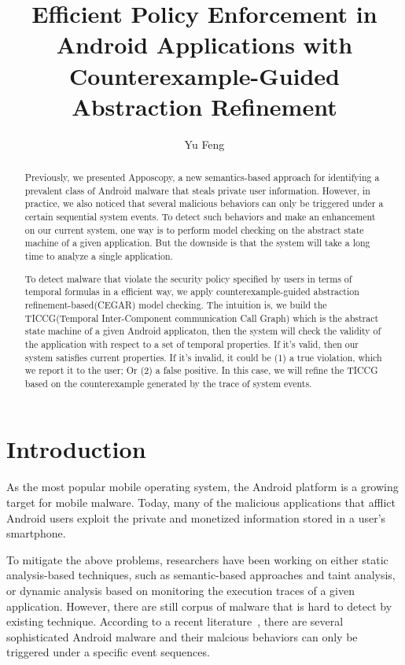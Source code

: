 \documentclass{article}
\begin{document}
\title{Efficient Policy Enforcement in Android Applications with Counterexample-Guided Abstraction Refinement}
\author{Yu Feng}

\maketitle

\begin{abstract}
Previously, we presented Apposcopy, a new semantics-based approach 
for identifying a prevalent class of Android malware that steals 
private user information. However, in practice, we also noticed 
that several malicious behaviors can only be triggered under a 
certain sequential system events. To detect such behaviors and make
an enhancement on our current system, one way is to perform model
checking on the abstract state machine of a given application.
But the downside is that the system will take a long time to analyze
a single application. 

To detect malware that violate the security policy specified by users 
in terms of temporal formulas in a efficient way, we apply 
counterexample-guided abstraction refinement-based(CEGAR) model 
checking. The intuition is, we build the TICCG(Temporal Inter-Component 
communication Call Graph) which is the abstract state machine of a given 
Android applicaton, then the system will check the validity of the application
with respect to a set of temporal properties. If it's valid, then 
our system satisfies current properties. If it's invalid, it could
be (1) a true violation, which we report it to the user; Or (2)
a false positive. In this case, we will refine the TICCG based on
the counterexample generated by the trace of system events.
\end{abstract}


\section{Introduction}
As the most popular mobile operating system, the Android platform 
is a growing target for  mobile malware.
Today, many of the malicious applications that afflict  Android users  exploit
the private and monetized information
stored in a user's smartphone. %

To mitigate the above problems, researchers have been working on either 
static analysis-based techniques, such as semantic-based approaches and taint analysis, 
or dynamic analysis based on monitoring the execution traces of a 
given application. However, there are still corpus of malware that is hard to detect 
by existing technique. According to a recent literature~\cite{pegasus}, there are
several sophisticated Android malware and their malcious behaviors can only 
be triggered under a specific event sequences.
\end{document}
